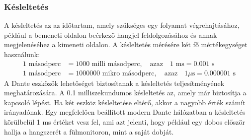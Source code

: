 \subsubsection{Késleltetés}
A késleltetés az az időtartam, amely szükséges egy folyamat végrehajtásához, 
például a bemeneti oldalon beérkező hangjel feldolgozásához és annak megjelenéséhez 
a kimeneti oldalon. A késleltetés mérésére két fő mértékegységet használunk:
\begin{align}
    1 \text{ másodperc} &= 1000 \text{ milli másodperc}, \quad \text{azaz} \quad 1 \text{ ms} = 0.001 \text{ s} \\
    1 \text{ másodperc} &= 1000000 \text{ mikro másodperc}, \quad \text{azaz} \quad 1 \mu\text{s} = 0.000001 \text{ s}
    \label{eq:microseconds}
\end{align}
A Dante eszközök lehetőséget biztosítanak a késleltetés teljesítményének 
meghatározására. A 0.1 milliszekundumos késleltetés az, amely már biztosítja a 
kapcsoló lépést. Ha két eszköz késleltetése eltérő, akkor a nagyobb érték számít 
irányadónak. Egy megfelelően beállított modern Dante hálózatban a késleltetés 
körülbelül 1 ms értéket vesz fel, ami azt jelenti, hogy például egy dobos 
először hallja a hangszerét a fülmonitoron, mint a saját dobját.
